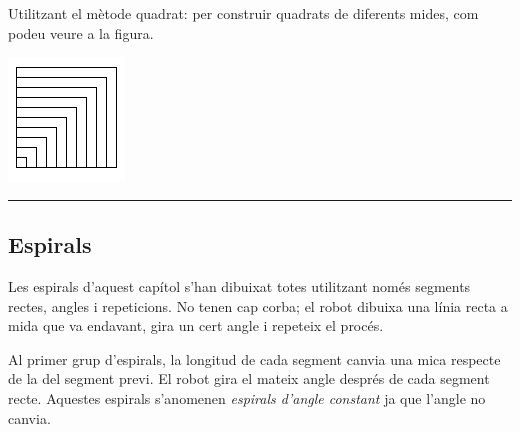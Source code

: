 \vspace*{5mm}

\begin{center}
\colorbox{black}{}
\end{center}
{\small
\noindent
Utilitzant el mètode \textsf{quadrat:} per construir quadrats de diferents mides, com podeu veure a la figura.}
\begin{center}
\includegraphics[scale=1]{Imatges/figuraE16-3.png} 
\end{center}
\noindent
\rule{\textwidth}{3pt}
 
\newpage
\subsection{Espirals}
Les espirals d'aquest capítol s'han dibuixat totes utilitzant només segments rectes, angles i repeticions. No tenen cap corba; el robot dibuixa una línia recta a mida que va endavant, gira un cert angle i repeteix el procés.

Al primer grup d'espirals, la longitud de cada segment canvia una mica respecte de la del segment previ. El robot gira el mateix angle després de cada segment recte. Aquestes espirals s'anomenen \emph{espirals d'angle constant} ja que l'angle no canvia.


